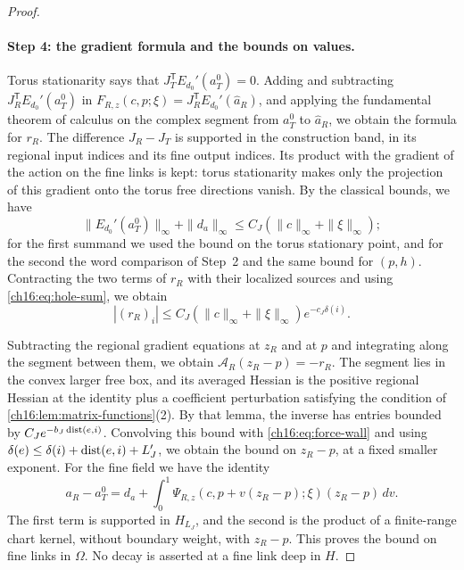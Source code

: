 \begin{proof}
\paragraph{Step 4: the gradient formula and the bounds on values.}
Torus stationarity says that $J_T^{\mathsf T}E_{d_0}'(a_T^0)=0$. Adding and subtracting $J_R^{\mathsf T}E_{d_0}'(a_T^0)$ in $F_{R,z}(c,p;\xi)=J_R^{\mathsf T}E_{d_0}'(\widehat a_R)$, and applying the fundamental theorem of calculus on the complex segment from $a_T^0$ to $\widehat a_R$, we obtain the formula for $r_R$. The difference $J_R-J_T$ is supported in the construction band, in its regional input indices and its fine output indices. Its product with the gradient of the action on the fine links is kept: torus stationarity makes only the projection of this gradient onto the torus free directions vanish. By the classical bounds, we have
\[
 \|E_{d_0}'(a_T^0)\|_\infty
       +\|d_a\|_\infty\le C_J(\|c\|_\infty+\|\xi\|_\infty);
\]
for the first summand we used the bound on the torus stationary point, and for the second the word comparison of Step~2 and the same bound for $(p,h)$. Contracting the two terms of $r_R$ with their localized sources and using \eqref{ch16:eq:hole-sum}, we obtain
\begin{equation}\label{ch16:eq:force-wall}
 |(r_R)_i|\le C_J(\|c\|_\infty+\|\xi\|_\infty)
                                                   e^{-c_J\delta(i)}.
\end{equation}

Subtracting the regional gradient equations at $z_R$ and at $p$ and integrating along the segment between them, we obtain $\mathcal A_R(z_R-p)=-r_R$. The segment lies in the convex larger free box, and its averaged Hessian is the positive regional Hessian at the identity plus a coefficient perturbation satisfying the condition of \cref{ch16:lem:matrix-functions}(2). By that lemma, the inverse has entries bounded by $C_Je^{-b_J\operatorname{dist}(e,i)}$. Convolving this bound with \eqref{ch16:eq:force-wall} and using $\delta(e)\le\delta(i)+\operatorname{dist}(e,i)+L'_J$, we obtain the bound on $z_R-p$, at a fixed smaller exponent. For the fine field we have the identity
\begin{equation}\label{ch16:eq:physical-response}
 a_R-a_T^0=d_a+
 \int_0^1\Psi_{R,z}(c,p+v(z_R-p);\xi)(z_R-p)\,dv.
\end{equation}
The first term is supported in $H_{L_J}$, and the second is the product of a finite-range chart kernel, without boundary weight, with $z_R-p$. This proves the bound on fine links in $\Omega$. No decay is asserted at a fine link deep in $H$.


\end{proof}
